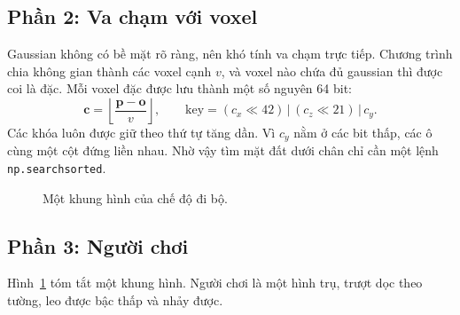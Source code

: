 \documentclass[9pt,twocolumn,a4paper]{extarticle}
\newcommand{\code}[1]{\texttt{#1}}
\begin{document}
\par\noindent{}\par\vspace{3pt}

\subsection{Phần 2: Va chạm với voxel}
Gaussian không có bề mặt rõ ràng, nên khó tính va chạm trực tiếp. Chương trình chia không gian thành các voxel cạnh $v$, và voxel nào chứa đủ gaussian thì được coi là đặc. Mỗi voxel đặc được lưu thành một số nguyên 64 bit:
\begin{equation}
\mathbf{c} = \left\lfloor \frac{\mathbf{p}-\mathbf{o}}{v} \right\rfloor,
\qquad
\text{key} = (c_x \ll 42)\,|\,(c_z \ll 21)\,|\,c_y.
\label{eq:voxel}
\end{equation}
Các khóa luôn được giữ theo thứ tự tăng dần. Vì $c_y$ nằm ở các bit thấp, các ô cùng một cột đứng liền nhau. Nhờ vậy tìm mặt đất dưới chân chỉ cần một lệnh \code{np.searchsorted}.

\par\noindent{}\par\vspace{3pt}

\begin{figure}[H]
\centering
{}
\caption{Một khung hình của chế độ đi bộ.}
\label{fig:t5}
\end{figure}

\subsection{Phần 3: Người chơi}
Hình~\ref{fig:t5} tóm tắt một khung hình. Người chơi là một hình trụ, trượt dọc theo tường, leo được bậc thấp và nhảy được.
\end{document}
